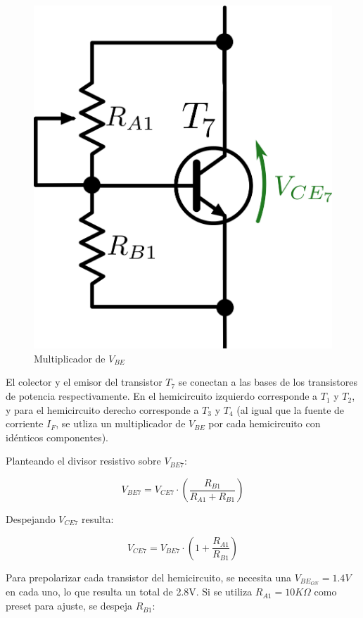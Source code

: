 \begin{figure}[!ht]
\begin{centering}
\includegraphics[scale=0.5]{Imagenes/MultiplicadorVBE.png}
\par\end{centering}
\caption{Multiplicador de $V_{BE}$}
\end{figure}

El colector y el emisor del transistor $T_7$ se conectan a las bases de los transistores de potencia respectivamente. En el hemicircuito izquierdo corresponde a $T_1$ y $T_2$, y para el hemicircuito derecho corresponde a $T_3$ y $T_4$ (al igual que la fuente de corriente $I_F$, se utliza un multiplicador de $V_{BE}$ por cada hemicircuito con idénticos componentes).\par
Planteando el divisor resistivo sobre $V_{BE7}$:

\[
V_{BE7} = V_{CE7} \cdot \left( \frac{R_{B1}}{R_{A1} + R_{B1}} \right)
\]

Despejando $V_{CE7}$ resulta:

\[
V_{CE7} = V_{BE7} \cdot \left( 1 + \frac{R_{A1}}{R_{B1}} \right)
\]

Para prepolarizar cada transistor del hemicircuito, se necesita una $V_{BE_{ON}} = 1.4V$ en cada uno, lo que resulta un total de 2.8V. Si se utiliza $R_{A1} = 10K\Omega$ como preset para ajuste, se despeja $R_{B1}$:

